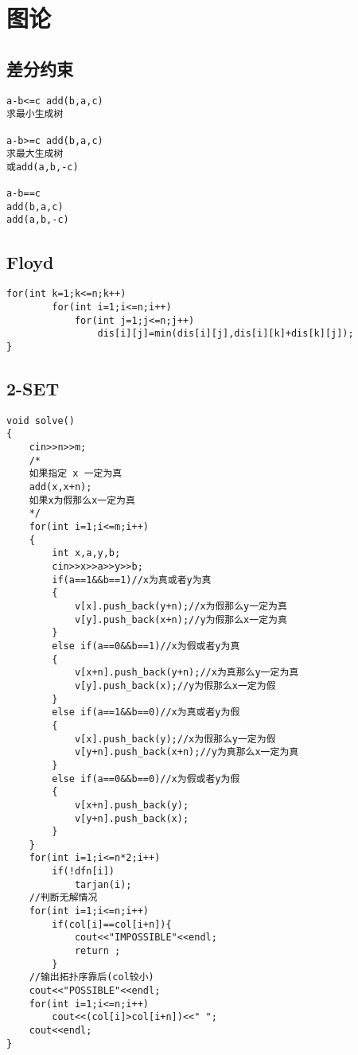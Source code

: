 \documentclass[12pt, a4paper, oneside]{ctexart}
\begin{document}
\newpage
\section{图论} 
\subsection{差分约束} 
\begin{lstlisting}
a-b<=c add(b,a,c)
求最小生成树

a-b>=c add(b,a,c)
求最大生成树
或add(a,b,-c) 

a-b==c
add(b,a,c)
add(a,b,-c)
\end{lstlisting}




\subsection{Floyd} 
\begin{lstlisting}
for(int k=1;k<=n;k++)
		for(int i=1;i<=n;i++)
			for(int j=1;j<=n;j++)
				dis[i][j]=min(dis[i][j],dis[i][k]+dis[k][j]);
}
\end{lstlisting}



\newpage
\subsection{2-SET} 
\begin{lstlisting}
void solve()
{
	cin>>n>>m;
	/*
	如果指定 x 一定为真
	add(x,x+n);
	如果x为假那么x一定为真
	*/
	for(int i=1;i<=m;i++)
	{
		int x,a,y,b;
		cin>>x>>a>>y>>b;
		if(a==1&&b==1)//x为真或者y为真
		{
			v[x].push_back(y+n);//x为假那么y一定为真
			v[y].push_back(x+n);//y为假那么x一定为真
		}
		else if(a==0&&b==1)//x为假或者y为真
		{
			v[x+n].push_back(y+n);//x为真那么y一定为真
			v[y].push_back(x);//y为假那么x一定为假
		}
		else if(a==1&&b==0)//x为真或者y为假
		{
			v[x].push_back(y);//x为假那么y一定为假
			v[y+n].push_back(x+n);//y为真那么x一定为真
		}
		else if(a==0&&b==0)//x为假或者y为假
		{
			v[x+n].push_back(y);
			v[y+n].push_back(x);
		}
	}
	for(int i=1;i<=n*2;i++)
		if(!dfn[i])
			tarjan(i);
	//判断无解情况
	for(int i=1;i<=n;i++)
		if(col[i]==col[i+n]){
			cout<<"IMPOSSIBLE"<<endl;
			return ;
		}
	//输出拓扑序靠后(col较小)
	cout<<"POSSIBLE"<<endl;
	for(int i=1;i<=n;i++)
		cout<<(col[i]>col[i+n])<<" ";
	cout<<endl;
}
\end{lstlisting}

\newpage
\end{document}
